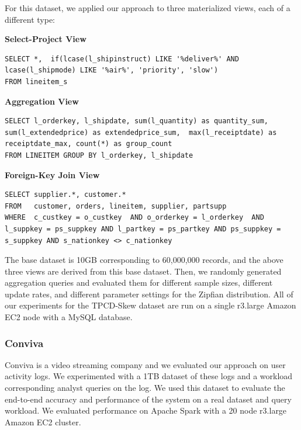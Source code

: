 For this dataset, we applied our approach to three materialized views, each of a different type:
\vspace{0.5em}

\textbf{Select-Project View}
\begin{lstlisting}
SELECT *,  if(lcase(l_shipinstruct) LIKE '%deliver%' AND lcase(l_shipmode) LIKE '%air%', 'priority', 'slow')  
FROM lineitem_s
\end{lstlisting}

\vspace{0.5em}

\textbf{Aggregation View}
\begin{lstlisting}
SELECT l_orderkey, l_shipdate, sum(l_quantity) as quantity_sum,  sum(l_extendedprice) as extendedprice_sum,  max(l_receiptdate) as receiptdate_max, count(*) as group_count 
FROM LINEITEM GROUP BY l_orderkey, l_shipdate
\end{lstlisting}

\vspace{0.5em}

\textbf{Foreign-Key Join View}
\begin{lstlisting}
SELECT supplier.*, customer.* 
FROM   customer, orders, lineitem, supplier, partsupp 
WHERE  c_custkey = o_custkey  AND o_orderkey = l_orderkey  AND l_suppkey = ps_suppkey AND l_partkey = ps_partkey AND ps_suppkey = s_suppkey AND s_nationkey <> c_nationkey
\end{lstlisting}

\vspace{1em}

The base dataset is 10GB corresponding to 60,000,000 records, and the above three views are derived from this base dataset.
Then, we randomly generated aggregation queries and evaluated them for different sample sizes, different update rates, and different parameter settings for the Zipfian distribution.
All of our experiments for the TPCD-Skew dataset are run on a single r3.large Amazon EC2 node with a MySQL database.

\subsubsection{Conviva}
Conviva is a video streaming company and we evaluated our approach on user activity logs. 
We experimented with a 1TB dataset of these logs and a workload corresponding analyst queries on the log.
We used this dataset to evaluate the end-to-end accuracy and performance of the system on a real dataset and query workload.
We evaluated performance on Apache Spark with a 20 node r3.large Amazon EC2 cluster. 

